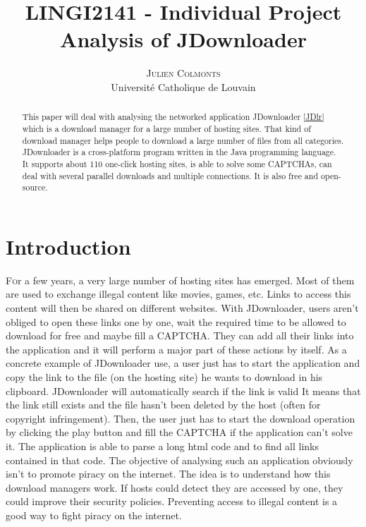 \documentclass[journal]{IEEEtran}
\title{\fontsize{24pt}{10pt}\selectfont\textbf{LINGI2141 - Individual Project \\Analysis of JDownloader}} %
\author{
\large
\textsc{Julien Colmonts}\\[2mm] %
\normalsize Université Catholique de Louvain \\ %
}
\date{}
\begin{document}
\maketitle %

\thispagestyle{fancy} %


\begin{abstract}

This paper will deal with analysing the networked application JDownloader \ref{JDlr} which is a download manager for a large number of hosting sites. That kind of download manager helps people to download a large number of files from all categories. JDownloader is a cross-platform program written in the Java programming language. It supports about 110 one-click hosting sites, is able to solve some CAPTCHAs, can deal with several parallel downloads and multiple connections. It is also free and open-source.

\end{abstract}



\section{Introduction}

\lettrine[nindent=0em,lines=3]{F}or a few years, a very large number of hosting sites has emerged. Most of them are used to exchange illegal content like movies, games, etc. Links to access this content will then be shared on different websites. With JDownloader, users aren't obliged to open these links one by one, wait the required time to be allowed to download for free and maybe fill a CAPTCHA. They can add all their links into the application and it will perform a major part of these actions by itself. As a concrete example of JDownloader use, a user just has to start the application and copy the link to the file (on the hosting site) he wants to download in his clipboard. JDownloader will automatically search if the link is valid It means that the link still exists and the file hasn't been deleted by the host (often for copyright infringement). Then, the user just has to start the download operation by clicking the play button and fill the CAPTCHA if the application can't solve it. The application is able to parse a long html code and to find all links contained in that code. The objective of analysing such an application obviously isn't to promote piracy on the internet. The idea is to understand how this download managers work. If hosts could detect they are accessed by one, they could improve their security policies. Preventing access to illegal content is a good way to fight piracy on the internet. 
\end{document}
